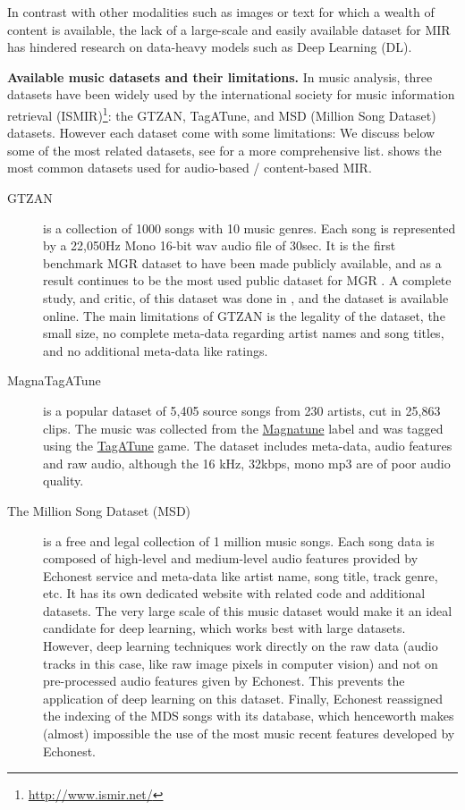 \documentclass{article}
\begin{document}
In contrast with other modalities such as images or text for which a wealth of content is available, the lack of a large-scale and easily available dataset for MIR has hindered research on data-heavy models such as Deep Learning (DL).

\noindent
{\bf Available music datasets and their limitations.} In music analysis, three datasets have been widely used by the international society for music information retrieval (ISMIR)\footnote{\url{http://www.ismir.net/}}: the GTZAN, TagATune, and MSD (Million Song Dataset) datasets. However each dataset come with some limitations:
We discuss below some of the most related datasets, see  for a more comprehensive list.
 shows the most common datasets used for audio-based / content-based MIR.
\begin{description}
	\item[GTZAN] \cite{gtzan} is a collection of 1000 songs with 10 music genres. Each song is represented by a 22,050Hz Mono 16-bit wav audio file of 30sec. It is the first benchmark MGR dataset to have been made publicly available, and as a result continues to be the most used public dataset for MGR \cite{mgr_eval}. A complete study, and critic, of this dataset was done in \cite{gtzan_critic_1}, and the dataset is available online. The main limitations of GTZAN is the legality of the dataset, the small size, no complete meta-data regarding artist names and song titles, and no additional meta-data like ratings.
	\item[MagnaTagATune] \cite{magnatagatune} is a popular dataset of 5,405 source songs from 230 artists, cut in 25,863 clips. The music was collected from the \href{https://magnatune.com/}{Magnatune} label and was tagged using the \href{http://tagatune.org/}{TagATune} game. The dataset includes meta-data, audio features and raw audio, although the 16 kHz, 32kbps, mono mp3 are of poor audio quality.
	\item[The Million Song Dataset (MSD)] \cite{msd} is a free and legal collection of 1 million music songs. Each song data is composed of high-level and medium-level audio features provided by  Echonest service and meta-data like artist name, song title, track genre, etc. It has its own dedicated website with related code and additional datasets. The very large scale of this music dataset would make it an ideal candidate for deep learning, which works best with large datasets. However, deep learning techniques work directly on the raw data (audio tracks in this case, like raw image pixels in computer vision) and not on pre-processed audio features given by Echonest. This prevents the application of deep learning on this dataset. Finally, Echonest reassigned the indexing of the MDS songs with its database, which henceworth makes (almost) impossible the use of the most music recent features developed by Echonest.

\end{description}
\end{document}
